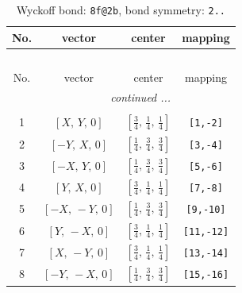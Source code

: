 \documentclass[fleqn,8pt]{jsarticle}
\begin{document}
\begin{longtable}{cccc}
\caption{Wyckoff bond: {\tt 8f@2b}, bond symmetry: {\tt 2..}}
 \\
 \hline \hline
No. & vector & center & mapping \\ \hline \endfirsthead

\multicolumn{3}{l}{\tablename\ \thetable{}} \\
 \hline \hline
No. & vector & center & mapping \\ \hline \endhead

 \hline \hline
\multicolumn{3}{r}{\footnotesize\it continued ...} \\ \endfoot

 \hline \hline
\multicolumn{3}{r}{} \\ \endlastfoot

1 & $\left[ X,\, Y,\, 0 \right]$ & $\left[ \frac{3}{4},\, \frac{1}{4},\, \frac{1}{4} \right]$ & {\tt [1,-2]} \\ \hline
2 & $\left[ - Y,\, X,\, 0 \right]$ & $\left[ \frac{1}{4},\, \frac{3}{4},\, \frac{3}{4} \right]$ & {\tt [3,-4]} \\ \hline
3 & $\left[ - X,\, Y,\, 0 \right]$ & $\left[ \frac{1}{4},\, \frac{3}{4},\, \frac{3}{4} \right]$ & {\tt [5,-6]} \\ \hline
4 & $\left[ Y,\, X,\, 0 \right]$ & $\left[ \frac{3}{4},\, \frac{1}{4},\, \frac{1}{4} \right]$ & {\tt [7,-8]} \\ \hline
5 & $\left[ - X,\, - Y,\, 0 \right]$ & $\left[ \frac{1}{4},\, \frac{3}{4},\, \frac{3}{4} \right]$ & {\tt [9,-10]} \\ \hline
6 & $\left[ Y,\, - X,\, 0 \right]$ & $\left[ \frac{3}{4},\, \frac{1}{4},\, \frac{1}{4} \right]$ & {\tt [11,-12]} \\ \hline
7 & $\left[ X,\, - Y,\, 0 \right]$ & $\left[ \frac{3}{4},\, \frac{1}{4},\, \frac{1}{4} \right]$ & {\tt [13,-14]} \\ \hline
8 & $\left[ - Y,\, - X,\, 0 \right]$ & $\left[ \frac{1}{4},\, \frac{3}{4},\, \frac{3}{4} \right]$ & {\tt [15,-16]} \\
\end{longtable}
\renewcommand{\arraystretch}{1.2}
\end{document}

